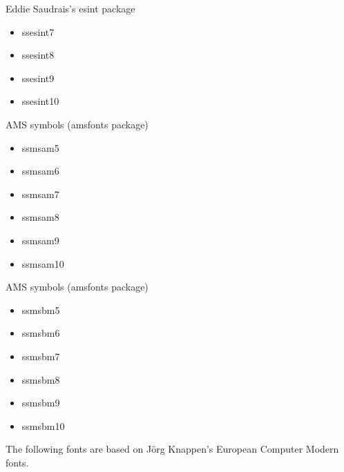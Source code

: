 \documentclass{amsart}
\begin{document}
\noindent\parbox[t]{0.33\textwidth}{
\raggedright
Eddie Saudrais's \textsf{esint} package
\begin{itemize}
\item \textsf{ssesint7}
\item \textsf{ssesint8}
\item \textsf{ssesint9}
\item \textsf{ssesint10}
\end{itemize}}\parbox[t]{0.33\textwidth}{
\raggedright
AMS symbols (\textsf{amsfonts} package)
\begin{itemize}
\item \textsf{ssmsam5}
\item \textsf{ssmsam6}
\item \textsf{ssmsam7}
\item \textsf{ssmsam8}
\item \textsf{ssmsam9}
\item \textsf{ssmsam10}
\end{itemize}}\parbox[t]{0.33\textwidth}{
\raggedright
AMS symbols (\textsf{amsfonts} package)
\begin{itemize}
\item \textsf{ssmsbm5}
\item \textsf{ssmsbm6}
\item \textsf{ssmsbm7}
\item \textsf{ssmsbm8}
\item \textsf{ssmsbm9}
\item \textsf{ssmsbm10}
\end{itemize}}

\bigskip

The following fonts are based on J\"org Knappen's European Computer Modern fonts.

\nobreak
\end{document}

